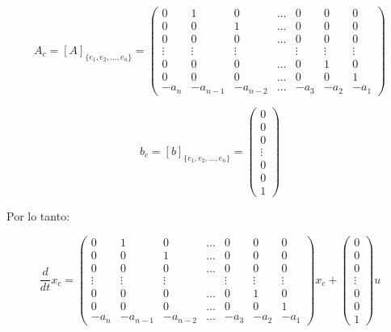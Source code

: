         \begin{equation}
            A_c = \left[ A \right]_{\{ e_1, e_2, \dots, e_n \}} =
            \begin{pmatrix}
            0 & 1 & 0 & \dots & 0 & 0 & 0 \\
            0 & 0 & 1 & \dots & 0 & 0 & 0 \\
            0 & 0 & 0 & \dots & 0 & 0 & 0 \\
            \vdots & \vdots & \vdots & & \vdots & \vdots & \vdots \\
            0 & 0 & 0 & \dots & 0 & 1 & 0 \\
            0 & 0 & 0 & \dots & 0 & 0 & 1 \\
            -a_{n} & -a_{n-1} & -a_{n-2} & \dots & -a_{3} & -a_{2} & -a_{1}
            \end{pmatrix}
        \end{equation}

        \begin{equation}
            b_c = \left[ b \right]_{\{ e_1, e_2, \dots, e_n \}} =
            \begin{pmatrix}
            0 \\
            0 \\
            0 \\
            \vdots \\
            0 \\
            0 \\
            1
            \end{pmatrix}
        \end{equation}

        Por lo tanto:

        \begin{equation}
            \frac{d}{dt} x_c =
            \begin{pmatrix}
            0 & 1 & 0 & \dots & 0 & 0 & 0 \\
            0 & 0 & 1 & \dots & 0 & 0 & 0 \\
            0 & 0 & 0 & \dots & 0 & 0 & 0 \\
            \vdots & \vdots & \vdots & & \vdots & \vdots & \vdots \\
            0 & 0 & 0 & \dots & 0 & 1 & 0 \\
            0 & 0 & 0 & \dots & 0 & 0 & 1 \\
            -a_{n} & -a_{n-1} & -a_{n-2} & \dots & -a_{3} & -a_{2} & -a_{1}
            \end{pmatrix} x_c +
            \begin{pmatrix}
            0 \\
            0 \\
            0 \\
            \vdots \\
            0 \\
            0 \\
            1
            \end{pmatrix} u
        \end{equation}

